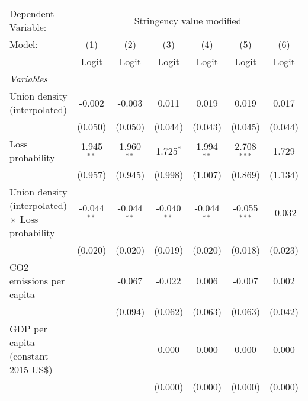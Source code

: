 
\begingroup
\centering
\begin{tabular}{lcccccc}
   \toprule
   Dependent Variable: & \multicolumn{6}{c}{Stringency value modified}\\
   Model:                                                  & (1)           & (2)           & (3)           & (4)            & (5)            & (6)\\  
                                                           &  Logit        & Logit         & Logit         & Logit          & Logit          & Logit\\  
   \midrule
   \emph{Variables}\\
   Union density (interpolated)                            & -0.002        & -0.003        & 0.011         & 0.019          & 0.019          & 0.017\\   
                                                           & (0.050)       & (0.050)       & (0.044)       & (0.043)        & (0.045)        & (0.044)\\   
   Loss probability                                        & 1.945$^{**}$  & 1.960$^{**}$  & 1.725$^{*}$   & 1.994$^{**}$   & 2.708$^{***}$  & 1.729\\   
                                                           & (0.957)       & (0.945)       & (0.998)       & (1.007)        & (0.869)        & (1.134)\\   
   Union density (interpolated) $\times$ Loss probability  & -0.044$^{**}$ & -0.044$^{**}$ & -0.040$^{**}$ & -0.044$^{**}$  & -0.055$^{***}$ & -0.032\\   
                                                           & (0.020)       & (0.020)       & (0.019)       & (0.020)        & (0.018)        & (0.023)\\   
   CO2 emissions per capita                                &               & -0.067        & -0.022        & 0.006          & -0.007         & 0.002\\   
                                                           &               & (0.094)       & (0.062)       & (0.063)        & (0.063)        & (0.042)\\   
   GDP per capita (constant 2015 US\$)                     &               &               & 0.000         & 0.000          & 0.000          & 0.000\\   
                                                           &               &               & (0.000)       & (0.000)        & (0.000)        & (0.000)\\   

\end{tabular}
